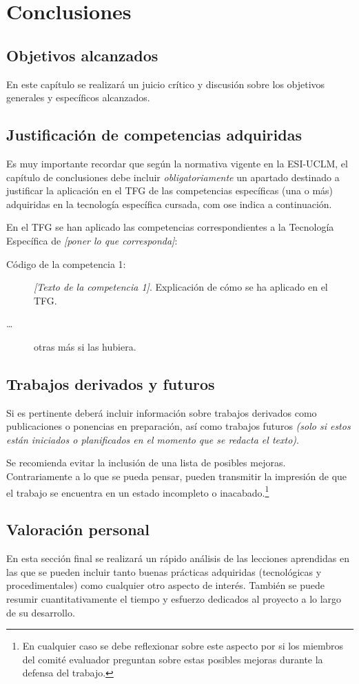 \chapter{Conclusiones}
\label{cap:Conclusiones}


\section{Objetivos alcanzados}
En este capítulo se realizará un juicio crítico y discusión sobre los objetivos generales y específicos alcanzados. 


\section{Justificación de competencias adquiridas}
Es muy importante recordar que según la normativa vigente en la ESI-UCLM, el capítulo de conclusiones debe incluir \emph{obligatoriamente} un apartado destinado a justificar la aplicación en el TFG de las competencias específicas (una o más) adquiridas en la tecnología específica cursada, com ose indica a continuación.

En el TFG se han aplicado las competencias correspondientes a la Tecnología Específica de \emph{[poner lo que corresponda]}:

\begin{description}
\item[Código de la competencia 1:] \emph{[Texto de la competencia 1]}. Explicación de cómo se ha aplicado en el TFG.
\item[\dots] otras más si las hubiera.
\end{description}

\section{Trabajos derivados y futuros}
Si es pertinente deberá incluir información sobre trabajos derivados como publicaciones o ponencias en preparación, así como trabajos futuros \emph{(solo si estos están iniciados o planificados en el momento que se redacta el texto)}.

Se recomienda evitar la inclusión de una lista de posibles mejoras. Contrariamente a lo que se pueda pensar, pueden transmitir la impresión de que el trabajo se encuentra en un estado incompleto o inacabado.\footnote{En cualquier caso se debe reflexionar sobre este aspecto por si los miembros del comité evaluador preguntan sobre estas posibles mejoras durante la defensa del trabajo.}

\section{Valoración personal}
En esta sección final se realizará un rápido análisis de las lecciones aprendidas en las que se pueden incluir tanto buenas prácticas adquiridas (tecnológicas y procedimentales) como cualquier otro aspecto de interés. También se puede resumir cuantitativamente el tiempo y esfuerzo dedicados al proyecto a lo largo de su desarrollo.







